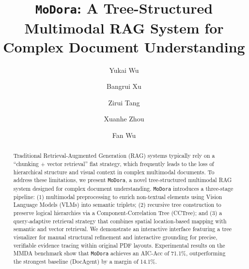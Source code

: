 \documentclass[sigconf, nonacm]{acmart}
\newcommand{\modora}{\texttt{MoDora}\xspace}
\begin{document}
\title{\modora: A Tree-Structured Multimodal RAG System for Complex Document Understanding}

\author{Yukai Wu}

\author{Bangrui Xu}

\author{Zirui Tang}


\author{Xuanhe Zhou}

\author{Fan Wu}


\renewcommand{\shortauthors}{Wu et al}

\begin{abstract}
Traditional Retrieval-Augmented Generation (RAG) systems typically rely on a ``chunking + vector retrieval'' flat strategy, which frequently leads to the loss of hierarchical structure and visual context in complex multimodal documents. To address these limitations, we present \modora, a novel tree-structured multimodal RAG system designed for complex document understanding. \modora introduces a three-stage pipeline: (1) multimodal preprocessing to enrich non-textual elements using Vision Language Models (VLMs) into semantic triplets; (2) recursive tree construction to preserve logical hierarchies via a Component-Correlation Tree (CCTree); and (3) a query-adaptive retrieval strategy that combines spatial location-based mapping with semantic and vector retrieval. We demonstrate an interactive interface featuring a tree visualizer for manual structural refinement and interactive grounding for precise, verifiable evidence tracing within original PDF layouts. Experimental results on the MMDA benchmark show that \modora achieves an AIC-Acc of 71.1\%, outperforming the strongest baseline (DocAgent) by a margin of 14.1\%.
\end{abstract}
\end{document}
